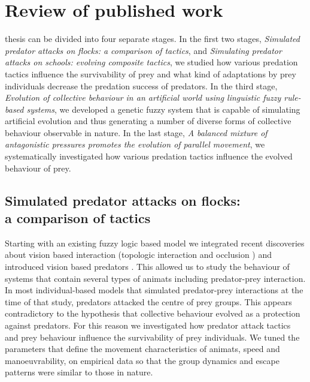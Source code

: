 









\chapter{Review of published work}
\label{chap:review}

 thesis can be divided into four separate stages. In the first two stages, \emph{Simulated predator attacks on flocks: a comparison of tactics}, and \emph{Simulating predator attacks on schools: evolving composite tactics}, we studied how various predation tactics influence the survivability of prey and what kind of adaptations by prey individuals decrease the predation success of predators. In the third stage, \emph{Evolution of collective behaviour in an artificial world using linguistic fuzzy rule-based systems}, we developed a genetic fuzzy system that is capable of simulating artificial evolution and thus generating a number of diverse forms of collective behaviour observable in nature. In the last stage, \emph{A balanced mixture of antagonistic pressures promotes the evolution of parallel movement}, we systematically investigated how various predation tactics influence the evolved behaviour of prey.

\section[Simulated predator attacks on flocks: a comparison of tactics]{Simulated predator attacks on flocks:\\ a comparison of tactics}

Starting with an existing fuzzy logic based model \cite{lebarbajec2005fuzzy,lebarbajec2005simulating} we integrated recent discoveries about vision based interaction (topologic interaction \cite{ballerini2008interaction} and occlusion \cite{kunz2012simulations}) and introduced vision based predators \cite{demsar2014simulated}. This allowed us to study the behaviour of systems that contain several types of animats including predator-prey interaction. In most individual-based models that simulated predator-prey interactions at the time of that study, predators attacked the centre of prey groups. This appears contradictory to the hypothesis that collective behaviour evolved as a protection against predators. For this reason we investigated how predator attack tactics and prey behaviour influence the survivability of prey individuals. We tuned the parameters that define the movement characteristics of animats, \eg speed and manoeuvrability, on empirical data so that the group dynamics and escape patterns were similar to those in nature.


